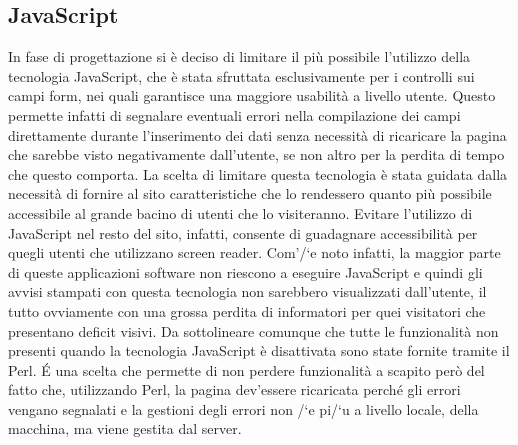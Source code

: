 \subsection{JavaScript}
In fase di progettazione si \`e deciso di limitare il pi\`u possibile l'utilizzo della tecnologia JavaScript, che \`e stata sfruttata esclusivamente per i controlli sui campi form, nei quali garantisce una maggiore usabilit\`a a livello utente. Questo permette infatti di segnalare eventuali errori nella compilazione dei campi direttamente durante l'inserimento dei dati senza necessit\`a di ricaricare la pagina che sarebbe visto negativamente dall'utente, se non altro per la perdita di tempo che questo comporta. La scelta di limitare questa tecnologia \`e stata guidata dalla necessit\`a di fornire al sito caratteristiche che lo rendessero quanto pi\`u possibile accessibile al grande bacino di utenti che lo visiteranno. Evitare l'utilizzo di JavaScript nel resto del sito, infatti, consente di guadagnare accessibilit\`a per quegli utenti che utilizzano screen reader. Com'/`e noto infatti, la maggior parte di queste applicazioni software non riescono a eseguire JavaScript e quindi gli avvisi stampati con questa tecnologia non sarebbero visualizzati dall'utente, il tutto ovviamente con una grossa perdita di informatori per quei visitatori che presentano deficit visivi.
Da sottolineare comunque che tutte le funzionalit\`a non presenti quando la tecnologia JavaScript \`e disattivata sono state fornite tramite il Perl. \'E una scelta che permette di non perdere funzionalit\`a a scapito per\`o del fatto che, utilizzando Perl, la pagina dev'essere ricaricata perch\'e gli errori vengano segnalati e la gestioni degli errori non /`e pi/`u a livello locale, della macchina, ma viene gestita dal server.
